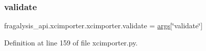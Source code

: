 \subsubsection{\texorpdfstring{validate}{validate}}
{\footnotesize\ttfamily fragalysis\+\_\+api.\+xcimporter.\+xcimporter.\+validate = \hyperlink{namespacefragalysis__api_1_1xcimporter_1_1xcimporter_a3ad0db7b1c2c8a00d4963bf5f7dd21bc}{args}\mbox{[}\char`\"{}validate\char`\"{}\mbox{]}}



Definition at line 159 of file xcimporter.\+py.

